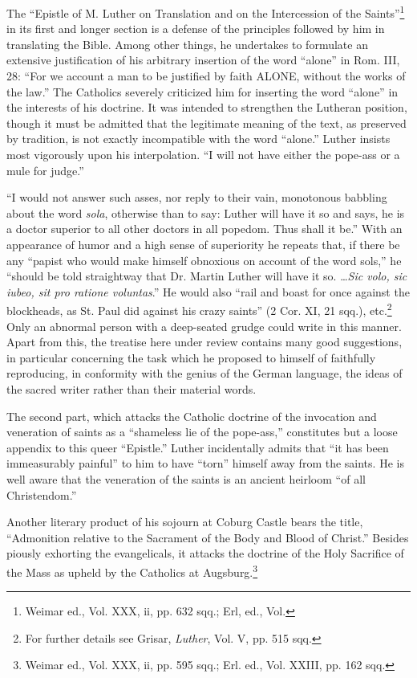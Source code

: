 The “Epistle of M. Luther on Translation and on the Intercession
of the Saints”\footnote{Weimar ed., Vol. XXX, ii, pp. 632 sqq.; Erl, ed., Vol.}
in its first and longer section is a defense of the principles
followed by him in translating the Bible. Among other things,
he undertakes to formulate an extensive justification of his arbitrary
insertion of the word “alone” in Rom. III, 28: “For we account a
man to be justified by faith ALONE, without the works of the law.”
The Catholics severely criticized him for inserting the word “alone”
in the interests of his doctrine. It was intended to strengthen the Lutheran
position, though it must be admitted that the legitimate meaning
of the text, as preserved by tradition, is not exactly incompatible
with the word “alone.” Luther insists most vigorously upon his interpolation.
“I will not have either the pope-ass or a mule for judge.”

“I would not answer such asses, nor reply to their vain, monotonous
babbling about the word \textit{sola}, otherwise than to say: Luther will
have it so and says, he is a doctor superior to all other doctors in all
popedom. Thus shall it be.” With an appearance of humor and a
high sense of superiority he repeats that, if there be any “papist who
would make himself obnoxious on account of the word sols,” he
“should be told straightway that Dr. Martin Luther will have it so.
\dots \textit{Sic volo, sic iubeo, sit pro ratione voluntas}.” He would also “rail
and boast for once against the blockheads, as St. Paul did against his
crazy saints” (2 Cor. XI, 21 sqq.), etc.\footnote
{For further details see Grisar, \textit{Luther}, Vol. V, pp. 515 sqq.}
Only an abnormal person
with a deep-seated grudge could write in this manner. Apart from
this, the treatise here under review contains many good suggestions, in
particular concerning the task which he proposed to himself of faithfully
reproducing, in conformity with the genius of the German
language, the ideas of the sacred writer rather than their material
words.

The second part, which attacks the Catholic doctrine of the invocation
and veneration of saints as a “shameless lie of the pope-ass,”
constitutes but a loose appendix to this queer “Epistle.” Luther incidentally
admits that “it has been immeasurably painful” to him to
have “torn” himself away from the saints. He is well aware that the
veneration of the saints is an ancient heirloom “of all Christendom.”

Another literary product of his sojourn at Coburg Castle bears the
title, “Admonition relative to the Sacrament of the Body and Blood
of Christ.” Besides piously exhorting the evangelicals, it attacks the
doctrine of the Holy Sacrifice of the Mass as upheld by the Catholics
at Augsburg.\footnote{Weimar ed., Vol. XXX, ii, pp. 595 sqq.; Erl. ed., Vol. XXIII, pp. 162 sqq.}


